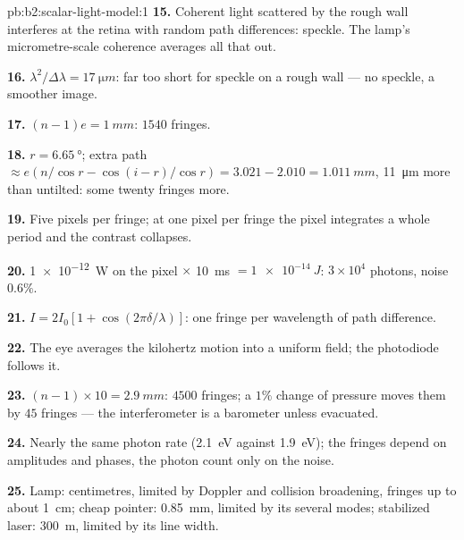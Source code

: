 \begin{solution}{pb:b2:scalar-light-model:1}
\textbf{15.} Coherent light scattered by the rough wall interferes at
the retina with random path differences: speckle. The lamp's
micrometre-scale coherence averages all that out.

\textbf{16.} $\lambda^2/\Delta\lambda = \qty{17}{\micro m}$: far too short for speckle on a
rough wall --- no speckle, a smoother image.

\textbf{17.} $(n - 1)e = \qty{1}{mm}$: $1540$ fringes.

\textbf{18.} $r = \qty{6.65}{\degree}$; extra path $\approx e(n/\cos r - \cos(i - r)/\cos r)
= 3.021 - 2.010 = \qty{1.011}{mm}$, \qty{11}{\micro m} more than untilted: some
twenty fringes more.

\textbf{19.} Five pixels per fringe; at one pixel per fringe the pixel
integrates a whole period and the contrast collapses.

\textbf{20.} \qty{1e-12}{W} on the pixel $\times$ \qty{10}{ms} $= \qty{1e-14}{J}$: $3 \times 10^4$
photons, noise $0.6\%$.

\textbf{21.} $I = 2I_0[1 + \cos(2\pi\delta/\lambda)]$: one fringe per wavelength of
path difference.

\textbf{22.} The eye averages the kilohertz motion into a uniform
field; the photodiode follows it.

\textbf{23.} $(n - 1) \times 10 = \qty{2.9}{mm}$: $4500$ fringes; a $1\%$ change of
pressure moves them by $45$ fringes --- the interferometer is a
barometer unless evacuated.

\textbf{24.} Nearly the same photon rate (\qty{2.1}{eV} against \qty{1.9}{eV});
the fringes depend on amplitudes and phases, the photon count only on
the noise.

\textbf{25.} Lamp: centimetres, limited by Doppler and collision
broadening, fringes up to about \qty{1}{cm}; cheap pointer: \qty{0.85}{mm},
limited by its several modes; stabilized laser: \qty{300}{m}, limited by
its line width.
\end{solution}
